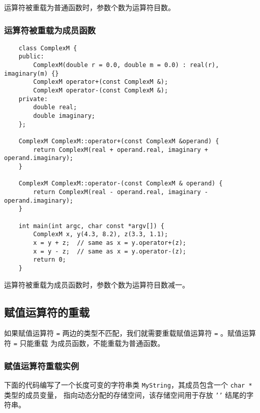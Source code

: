 \documentclass[UTF8]{ctexart}
\begin{document}
运算符被重载为普通函数时，参数个数为运算符目数。

\subsubsection{运算符被重载为成员函数}
\begin{verbatim}
    class ComplexM {
    public:
        ComplexM(double r = 0.0, double m = 0.0) : real(r), imaginary(m) {}
        ComplexM operator+(const ComplexM &);
        ComplexM operator-(const ComplexM &);
    private:
        double real;
        double imaginary;
    };

    ComplexM ComplexM::operator+(const ComplexM &operand) {
        return ComplexM(real + operand.real, imaginary + operand.imaginary);
    }

    ComplexM ComplexM::operator-(const ComplexM & operand) {
        return ComplexM(real - operand.real, imaginary - operand.imaginary);
    }

    int main(int argc, char const *argv[]) {
        ComplexM x, y(4.3, 8.2), z(3.3, 1.1);
        x = y + z;  // same as x = y.operator+(z);
        x = y - z;  // same as x = y.operator-(z);
        return 0;
    }
\end{verbatim}

运算符被重载为成员函数时，参数个数为运算符目数减一。

\subsection{赋值运算符的重载}
如果赋值运算符 \texttt{=} 两边的类型不匹配，我们就需要重载赋值运算符 \texttt{=} 。赋值运算符 \texttt{=} 只能重载
为成员函数，不能重载为普通函数。

\subsubsection{赋值运算符重载实例}
下面的代码编写了一个长度可变的字符串类 \texttt{MyString}，其成员包含一个 \texttt{char *} 类型的成员变量，
指向动态分配的存储空间，该存储空间用于存放 \texttt{'\0'} 结尾的字符串。
\end{document}
